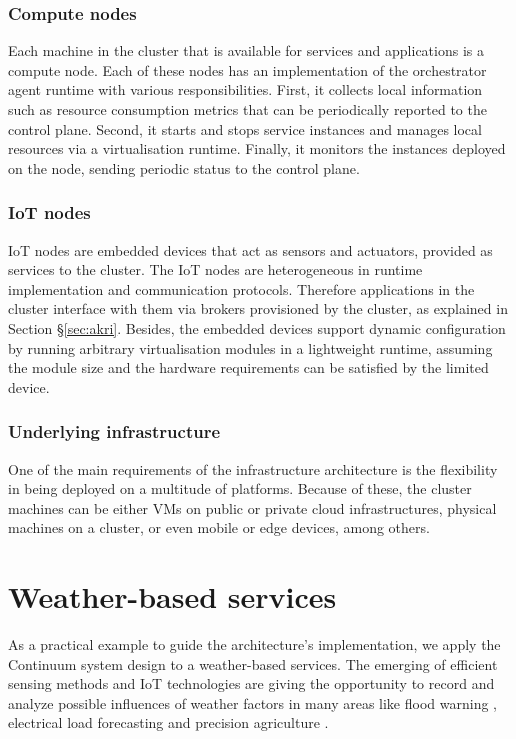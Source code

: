 \subsubsection{Compute nodes}

Each machine in the cluster that is available for services and applications is a compute node. Each of these nodes has an implementation of the orchestrator agent runtime with various responsibilities. First, it collects local information such as resource consumption metrics that can be periodically reported to the control plane. Second, it starts and stops service instances and manages local resources via a virtualisation runtime. Finally, it monitors the instances deployed on the node, sending periodic status to the control plane.

\subsubsection{IoT nodes}

IoT nodes are embedded devices that act as sensors and actuators, provided as services to the cluster. The IoT nodes are heterogeneous in runtime implementation and communication protocols. Therefore applications in the cluster interface with them via brokers provisioned by the cluster, as explained in Section §\ref{sec:akri}. Besides, the embedded devices support dynamic configuration by running arbitrary virtualisation modules in a lightweight runtime, assuming the module size and the hardware requirements can be satisfied by the limited device.

\subsubsection{Underlying infrastructure}

One of the main requirements of the infrastructure architecture is the flexibility in being deployed on a multitude of platforms. Because of these, the cluster machines can be either VMs on public or private cloud infrastructures, physical machines on a cluster, or even mobile or edge devices, among others.

\section{Weather-based services}

As a practical example to guide the architecture's implementation, we apply the Continuum system design to a weather-based services. The emerging of efficient sensing methods and IoT technologies are giving the opportunity to record and analyze possible influences of weather factors in many areas like flood warning \cite{brzoza2016embedded}, electrical load forecasting \cite{weather-load-forecasting} and precision agriculture \cite{keswani2019adapting}.

